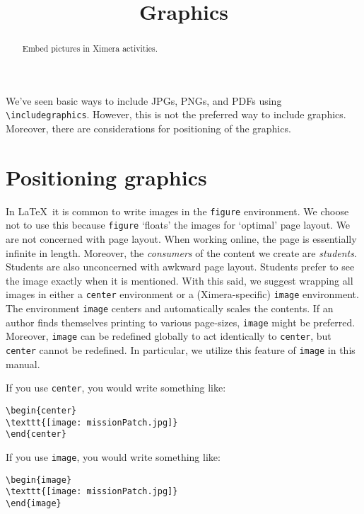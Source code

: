 \documentclass{ximera}
\title{Graphics}
\begin{document}
\begin{abstract}
  Embed pictures in Ximera activities.
\end{abstract}
\maketitle

We've seen basic ways to include JPGs, PNGs, and PDFs using
\verb!\includegraphics!. However, this is not the preferred way to include
graphics. Moreover, there are considerations for positioning of the graphics.

\section{Positioning graphics}

In \LaTeX\ it is common to write images in the \verb!figure! environment. We
choose not to use this because \verb!figure! `floats' the images for `optimal'
page layout. We are not concerned with page layout. When working online, the
page is essentially infinite in length. Moreover, the \textit{consumers} of the
content we create are \textit{students}. Students are also unconcerned with
awkward page layout. Students prefer to see the image exactly when it is
mentioned. With this said, we suggest wrapping all images in either a
\verb!center! environment or a (Ximera-specific) \verb!image! environment.
The environment \verb!image! centers and automatically scales the contents.  If
an author finds themselves printing to various page-sizes, \verb!image! might
be preferred. Moreover, \verb!image! can be redefined globally to act
identically to \verb!center!, but \verb!center! cannot be redefined. In
particular, we utilize this feature of \verb!image! in this manual.

If you use \verb!center!, you would write something like:
\begin{verbatim}
\begin{center}
\texttt{[image: missionPatch.jpg]}
\end{center}
\end{verbatim}
If you use \verb!image!, you would write something like:
\begin{verbatim}
\begin{image}
\texttt{[image: missionPatch.jpg]}
\end{image}
\end{verbatim}
\end{document}
